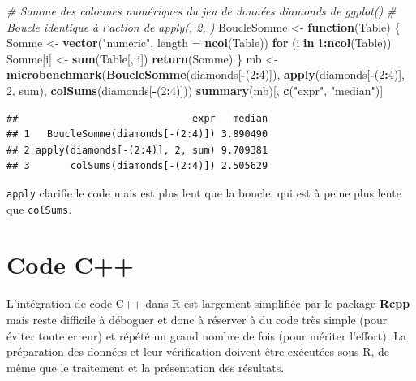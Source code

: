 \documentclass[
  12pt,
  french,
  a4paper,
  extrafontsizes,onecolumn,openright
  ]{memoir}
\newenvironment{Shaded}{\begin{snugshade}}{\end{snugshade}}
\newcommand{\CommentTok}[1]{\textcolor[rgb]{0.56,0.35,0.01}{\textit{#1}}}
\newcommand{\ControlFlowTok}[1]{\textcolor[rgb]{0.13,0.29,0.53}{\textbf{#1}}}
\newcommand{\DataTypeTok}[1]{\textcolor[rgb]{0.13,0.29,0.53}{#1}}
\newcommand{\DecValTok}[1]{\textcolor[rgb]{0.00,0.00,0.81}{#1}}
\newcommand{\KeywordTok}[1]{\textcolor[rgb]{0.13,0.29,0.53}{\textbf{#1}}}
\newcommand{\NormalTok}[1]{#1}
\newcommand{\OperatorTok}[1]{\textcolor[rgb]{0.81,0.36,0.00}{\textbf{#1}}}
\newcommand{\StringTok}[1]{\textcolor[rgb]{0.31,0.60,0.02}{#1}}
\begin{document}
\begin{Shaded}
\begin{Highlighting}[]
\CommentTok{# Somme des colonnes numériques du jeu de données diamonds de ggplot()}
\CommentTok{# Boucle identique à l'action de apply(, 2, )}
\NormalTok{BoucleSomme <-}\StringTok{ }\ControlFlowTok{function}\NormalTok{(Table) \{}
\NormalTok{  Somme <-}\StringTok{ }\KeywordTok{vector}\NormalTok{(}\StringTok{"numeric"}\NormalTok{, }\DataTypeTok{length =} \KeywordTok{ncol}\NormalTok{(Table))}
  \ControlFlowTok{for}\NormalTok{ (i }\ControlFlowTok{in} \DecValTok{1}\OperatorTok{:}\KeywordTok{ncol}\NormalTok{(Table)) Somme[i] <-}\StringTok{ }\KeywordTok{sum}\NormalTok{(Table[, i])}
  \KeywordTok{return}\NormalTok{(Somme)}
\NormalTok{\}}
\NormalTok{mb <-}\StringTok{ }\KeywordTok{microbenchmark}\NormalTok{(}\KeywordTok{BoucleSomme}\NormalTok{(diamonds[}\OperatorTok{-}\NormalTok{(}\DecValTok{2}\OperatorTok{:}\DecValTok{4}\NormalTok{)]), }
                     \KeywordTok{apply}\NormalTok{(diamonds[}\OperatorTok{-}\NormalTok{(}\DecValTok{2}\OperatorTok{:}\DecValTok{4}\NormalTok{)], }\DecValTok{2}\NormalTok{, sum), }
                     \KeywordTok{colSums}\NormalTok{(diamonds[}\OperatorTok{-}\NormalTok{(}\DecValTok{2}\OperatorTok{:}\DecValTok{4}\NormalTok{)]))}
\KeywordTok{summary}\NormalTok{(mb)[, }\KeywordTok{c}\NormalTok{(}\StringTok{"expr"}\NormalTok{, }\StringTok{"median"}\NormalTok{)]}
\end{Highlighting}
\end{Shaded}

\begin{verbatim}
##                              expr   median
## 1   BoucleSomme(diamonds[-(2:4)]) 3.890490
## 2 apply(diamonds[-(2:4)], 2, sum) 9.709381
## 3       colSums(diamonds[-(2:4)]) 2.505629
\end{verbatim}

\normalsize

\texttt{apply} clarifie le code mais est plus lent que la boucle, qui est à peine plus lente que \texttt{colSums}.

\hypertarget{sec:cpp}{%
\section{Code C++}\label{sec:cpp}}

L'intégration de code C++ dans R est largement simplifiée par le package \textbf{Rcpp} mais reste difficile à déboguer et donc à réserver à du code très simple (pour éviter toute erreur) et répété un grand nombre de fois (pour mériter l'effort).
La préparation des données et leur vérification doivent être exécutées sous R, de même que le traitement et la présentation des résultats.
\end{document}
